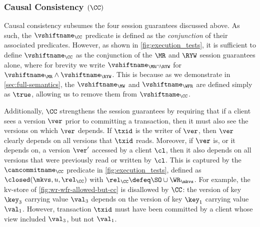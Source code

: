 
\subsubsection{Causal Consistency \((\CC)\)}
Causal consistency subsumes the  four session guarantees discussed above. 
As such, the \(\vshiftname_\CC\) predicate is defined as the \emph{conjunction} of their associated \vshiftname predicates.
However, as shown in  \cref{fig:execution_tests}, it is sufficient to define \(\vshiftname_\CC\)
as the conjunction of the \(\MR\) and \(\RYW\) session guarantees alone, where for brevity we 
write \(\vshiftname_{\MR \cap \RYW}\) for  \(\vshiftname_{\MR} \land \vshiftname_{\RYW}\).
This is because 
as we demonstrate in \cref{sec:full-semantics},
the \(\vshiftname_{\MW}\) and \(\vshiftname_{\WFR}\) are defined simply as \( \true \), allowing us to remove them from \(\vshiftname_{\CC}\).

Additionally, \(\CC\) strengthens the session guarantees by requiring that if a client sees a version \(\ver\) prior to committing a transaction, then it must also see the versions 
on which \(\ver\) depends.
If \(\txid\) is the writer of \(\ver\), then 
\(\ver\) clearly depends on all versions that \(\txid\) reads. 
Moreover, if \(\ver\) is, or it depends on, a version \(\ver'\) accessed by 
a client \(\cl\), then it also depends on all versions that were previously 
read or written by \(\cl\). 
This is captured by the \(\cancommitname_{\CC}\) predicate in \cref{fig:execution_tests}, 
defined as \(\closed(\mkvs, u, \rel_{\CC})\) with \(\rel_\CC \defeq \SO \cup \WR_{\mkvs}\).
For example, the kv-store of 
\cref{fig:wr-wfr-allowed-but-cc} 
is disallowed by \(\CC\): the version of key \(\key_3\) carrying value \(\val_3\) depends on the version of key \(\key_1\) carrying value \(\val_1\). However, transaction \(\txid\) must have been committed by a client whose view included \(\val_3\), but not \(\val_1\).

